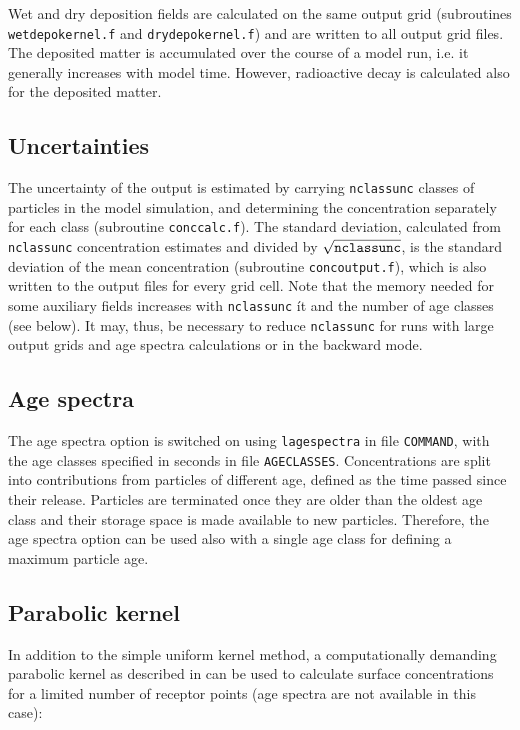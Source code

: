 \documentclass{egu}                  %
\begin{document}
Wet and dry deposition fields are calculated on the same output grid
(subroutines \verb|wetdepokernel.f| and \verb|drydepokernel.f|) and are written
to all output grid files.  The deposited matter is accumulated over the course
of a model run, i.e.  it generally increases with model time.  However,
radioactive decay is calculated also for the deposited matter.

\subsection{Uncertainties}

The uncertainty of the output is estimated by carrying \verb|nclassunc| classes
of particles in the model simulation, and determining the concentration
separately for each class (subroutine \verb|conccalc.f|).  The standard
deviation, calculated from \verb|nclassunc| concentration estimates and divided
by $\sqrt{\tt{nclassunc}}$, is the standard deviation of the mean concentration
(subroutine \verb|concoutput.f|), which is also written to the output files for
every grid cell.  Note that the memory needed for some auxiliary fields
increases with \verb|nclassunc| {ít and} the number of age classes (see below).
It may, thus, be necessary to reduce \verb|nclassunc| for runs with large
output grids and age spectra calculations or in the backward mode.

\subsection{Age spectra}

The age spectra option is switched on using \verb|lagespectra| in file
\verb|COMMAND|, with the age classes specified in seconds in file
\verb|AGECLASSES|.  Concentrations are split into contributions from particles
of different age, defined as the time passed since their release.  Particles
are terminated once they are older than the oldest age class and their storage
space is made available to new particles.  Therefore, the age spectra option
can be used also with a single age class for defining a maximum particle age.

\subsection{Parabolic kernel}

In addition to the simple uniform kernel method, a computationally demanding
parabolic kernel as described in \citep{uliasz1994} can be used to calculate
surface concentrations for a limited number of receptor points (age spectra are
not available in this case):
\end{document}
